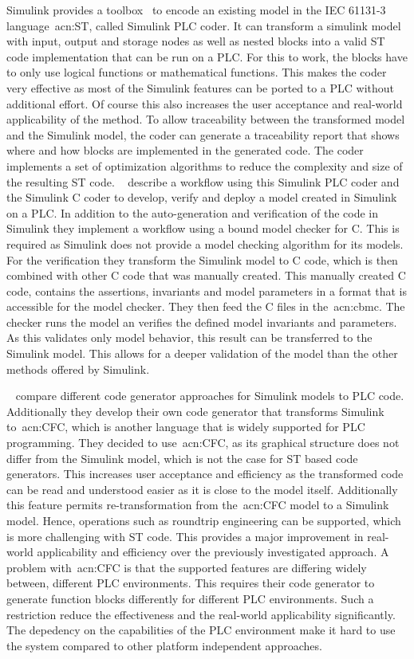 Simulink provides a toolbox~\cite{Simulink:PLC} to encode an existing model in the IEC 61131-3 language~\acrshort{acn:ST}, called Simulink PLC coder.
It can transform a simulink model with input, output and storage nodes as well as nested blocks into a valid ST code implementation that can be run on a PLC.
For this to work, the blocks have to only use logical functions or mathematical functions.
This makes the coder very effective as most of the Simulink features can be ported to a PLC without additional effort.
Of course this also increases the user acceptance and real-world applicability of the method.
To allow traceability between the transformed model and the Simulink model, the coder can generate a traceability report that shows where and how blocks are implemented in the generated code.
The coder implements a set of optimization algorithms to reduce the complexity and size of the resulting ST code.
\citeauthor{7535242}~\cite{7535242} describe a workflow using this Simulink PLC coder and the Simulink C coder to develop, verify and deploy a model created in Simulink on a PLC.
In addition to the auto-generation and verification of the code in Simulink they implement a workflow using a bound model checker for C.
This is required as Simulink does not provide a model checking algorithm for its models.
For the verification they transform the Simulink model to C code, which is then combined with other C code that was manually created.
This manually created C code, contains the assertions, invariants and model parameters in a format that is accessible for the model checker.
They then feed the C files in the~\acrfull{acn:cbmc}.
The checker runs the model an verifies the defined model invariants and parameters.
As this validates only model behavior, this result can be transferred to the Simulink model.
This allows for a deeper validation of the model than the other methods offered by Simulink.

\citeauthor{6489667}~\cite{6489667} compare different code generator approaches for Simulink models to PLC code.
Additionally they develop their own code generator that transforms Simulink to~\acrfull{acn:CFC}, which is another language that is widely supported for PLC programming.
They decided to use~\acrshort{acn:CFC}, as its graphical structure does not differ from the Simulink model, which is not the case for ST based code generators.
This increases user acceptance and efficiency as the transformed code can be read and understood easier as it is close to the model itself.
Additionally this feature permits re-transformation from the~\acrshort{acn:CFC} model to a Simulink model.
Hence, operations such as roundtrip engineering can be supported, which is more challenging with ST code.
This provides a major improvement in real-world applicability and efficiency over the previously investigated approach.
A problem with~\acrshort{acn:CFC} is that the supported features are differing widely between, different PLC environments.
This requires their code generator to generate function blocks differently for different PLC environments.
Such a restriction reduce the effectiveness and the real-world applicability significantly.
The depedency on the capabilities of the PLC environment make it hard to use the system compared to other platform independent approaches.

